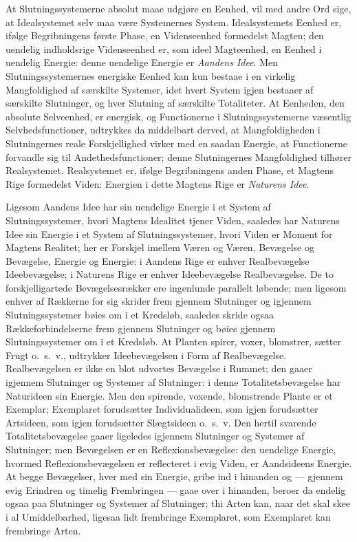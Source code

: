 \documentclass[12pt]{book}
\newcommand{\opage}[1]{\marginnote{\footnotesize\textit{[#1]}}}
\begin{document}
At Slutningssystemerne absolut maae udgjøre en Eenhed, vil med andre Ord sige, at Idealsystemet selv
maa være Systemernes System. Idealsystemets Eenhed er, ifølge Begribningens første Phase, en
Videnseenhed formedelst Magten; den uendelig indholdsrige Videnseenhed er, som ideel Magteenhed, en
Eenhed i uendelig Energie: denne uendelige Energie er \emph{Aandens Idee}. Men Slutningssystemernes
energiske Eenhed kan kun bestaae i en virkelig Mangfoldighed af særskilte Systemer, idet hvert System
igjen bestaaer af særskilte Slutninger, og hver Slutning af særskilte Totaliteter. At Eenheden, den
absolute Selveenhed, er energisk, og Functionerne i Slutningssystemerne væsentlig Selvhedsfunctioner,
udtrykkes da middelbart derved, at Mangfoldigheden i Slutningernes reale Forskjellighed virker med en
saadan Energie, at Functionerne forvandle sig til Andethedsfunctioner; denne Slutningernes
Mangfoldighed tilhører Realsystemet. Realsystemet er, ifølge Begribningens anden Phase, et Magtens
Rige formedelst Viden: Energien i dette Magtens Rige er \emph{Naturens Idee}.

\opage{451} Ligesom Aandens Idee har sin uendelige Energie i et System af Slutningssystemer, hvori Magtens
Idealitet tjener Viden, saaledes har Naturens Idee sin Energie i et System af Slutningssystemer, hvori
Viden er Moment for Magtens Realitet; her er Forskjel imellem Væren og Væren, Bevægelse og Bevægelse,
Energie og Energie: i Aandens Rige er enhver Realbevægelse Ideebevægelse; i Naturens Rige er enhver
Ideebevægelse Realbevægelse. De to forskjelligartede Bevægelsesrækker ere ingenlunde parallelt
løbende; men ligesom enhver af Rækkerne for sig skrider frem gjennem Slutninger og igjennem
Slutningssystemer bøies om i et Kredsløb, saaledes skride ogsaa Rækkeforbindelserne frem gjennem
Slutninger og bøies gjennem Slutningssystemer om i et Kredsløb. At Planten spirer, voxer, blomstrer,
sætter Frugt o.\ s.\ v., udtrykker Ideebevægelsen i Form af Realbevægelse. Realbevægelsen er ikke en
blot udvortes Bevægelse i Rummet; den gaaer igjennem Slutninger og Systemer af Slutninger: i denne
Totalitetsbevægelse har Naturideen sin Energie. Men den spirende, voxende, blomstrende Plante er et
Exemplar; Exemplaret forudsætter Individualideen, som igjen forudsætter Artsideen, som igjen
forudsætter Slægtsideen o.\ s.\ v. Den hertil svarende Totalitetsbevægelse gaaer ligeledes igjennem
Slutninger og Systemer af Slutninger; men Bevægelsen er en Reflexionsbevægelse: den uendelige Energie,
hvormed Reflexionsbevægelsen er reflecteret i evig Viden, er Aandsideens Energie. At begge Bevægelser,
hver med sin Energie, gribe ind i hinanden og — gjennem evig Erindren og timelig Frembringen — gaae
over i hinanden, beroer da endelig ogsaa paa Slutninger og Systemer af Slutninger; thi Arten kan, naar
det skal skee i al Umiddelbarhed, ligesaa lidt frembringe Exemplaret, som Exemplaret kan frembringe
Arten.
\end{document}
